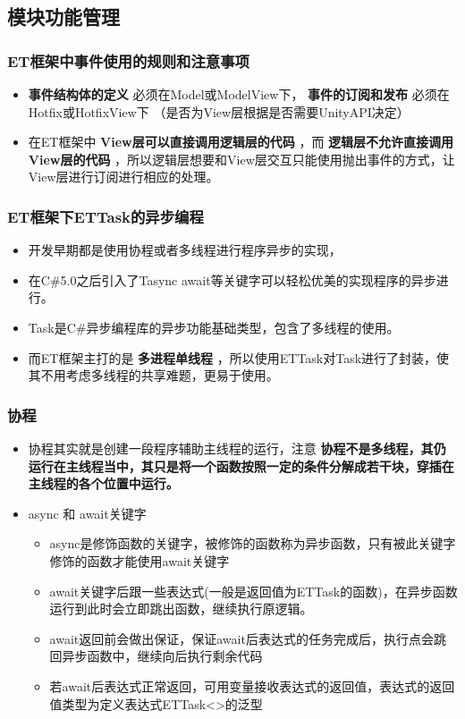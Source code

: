 \documentclass[9pt, b5paper]{article}
\begin{document}
\subsection{模块功能管理}
\label{sec-1-2}
\subsubsection{ET框架中事件使用的规则和注意事项}
\label{sec-1-2-1}
\begin{itemize}
\item \textbf{事件结构体的定义} 必须在Model或ModelView下， \textbf{事件的订阅和发布} 必须在Hotfix或HotfixView下 （是否为View层根据是否需要UnityAPI决定）
\item 在ET框架中 \textbf{View层可以直接调用逻辑层的代码} ，而 \textbf{逻辑层不允许直接调用View层的代码} ，所以逻辑层想要和View层交互只能使用抛出事件的方式，让View层进行订阅进行相应的处理。
\end{itemize}
\subsubsection{ET框架下ETTask的异步编程}
\label{sec-1-2-2}
\begin{itemize}
\item 开发早期都是使用协程或者多线程进行程序异步的实现，
\item 在C\#5.0之后引入了Tasync await等关键字可以轻松优美的实现程序的异步进行。
\item Task是C\#异步编程库的异步功能基础类型，包含了多线程的使用。
\item 而ET框架主打的是 \textbf{多进程单线程} ，所以使用ETTask对Task进行了封装，使其不用考虑多线程的共享难题，更易于使用。
\end{itemize}
\subsubsection{协程}
\label{sec-1-2-3}
\begin{itemize}
\item 协程其实就是创建一段程序辅助主线程的运行，注意 \textbf{协程不是多线程，其仍运行在主线程当中，其只是将一个函数按照一定的条件分解成若干块，穿插在主线程的各个位置中运行。}
\item async 和 await关键字
\begin{itemize}
\item async是修饰函数的关键字，被修饰的函数称为异步函数，只有被此关键字修饰的函数才能使用await关键字
\item await关键字后跟一些表达式(一般是返回值为ETTask的函数)，在异步函数运行到此时会立即跳出函数，继续执行原逻辑。
\item await返回前会做出保证，保证await后表达式的任务完成后，执行点会跳回异步函数中，继续向后执行剩余代码
\item 若await后表达式正常返回，可用变量接收表达式的返回值，表达式的返回值类型为定义表达式ETTask<>的泛型
\end{itemize}
\end{itemize}
\end{document}
